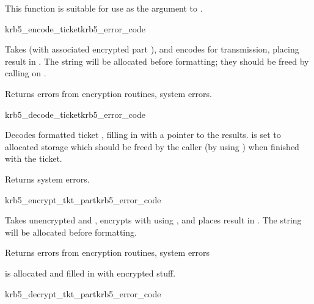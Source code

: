 This function is suitable for use as the 
argument to .

\begin{funcdecl}{krb5_encode_ticket}{krb5_error_code}{\funcin}
\funcout
{}
\end{funcdecl}

Takes  (with associated encrypted part
),
and encodes for transmission, placing result in .
The string  will be allocated before formatting;
they should be freed by calling  on
.

Returns errors from encryption routines, system errors.

\begin{funcdecl}{krb5_decode_ticket}{krb5_error_code}{\funcin}
\funcout
{}
\end{funcdecl}

Decodes formatted ticket ,
filling in  with a pointer to the results.
 is set to allocated storage which should be
freed by the caller (by using ) when finished with
the ticket.

Returns system errors.


\begin{funcdecl}{krb5_encrypt_tkt_part}{krb5_error_code}{ \funcin}
\funcinout
{}
\end{funcdecl}

Takes unencrypted  and
, encrypts with
using , and places result in
.
The string  will be allocated
before formatting.

Returns errors from encryption routines, system errors

 is allocated and filled in with
encrypted stuff.

\begin{funcdecl}{krb5_decrypt_tkt_part}{krb5_error_code}{\funcin}
\funcinout
{}
\end{funcdecl}

